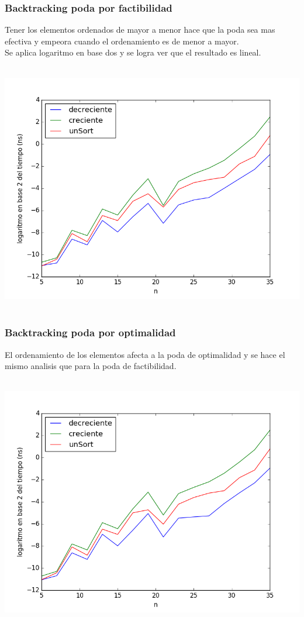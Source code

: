 \subsubsection{Backtracking poda por factibilidad}
Tener los elementos ordenados de mayor a menor hace que la poda sea mas efectiva y empeora cuando el ordenamiento es de menor a mayor.\\
Se aplica logaritmo en base dos y se logra ver que el resultado es lineal.
\begin{center}
\includegraphics[width=16cm, height=11cm]{facSort.png}
\end{center}
\subsubsection{Backtracking poda por optimalidad}
El ordenamiento de los elementos afecta a la poda de optimalidad y se hace el mismo analisis que para la poda de factibilidad.
\begin{center}
\includegraphics[width=16cm, height=11cm]{opSort.png}
\end{center}
